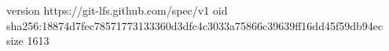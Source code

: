 version https://git-lfs.github.com/spec/v1
oid sha256:18874d7fec78571773133360d3dfc4c3033a75866c39639ff16dd45f59db94ec
size 1613
